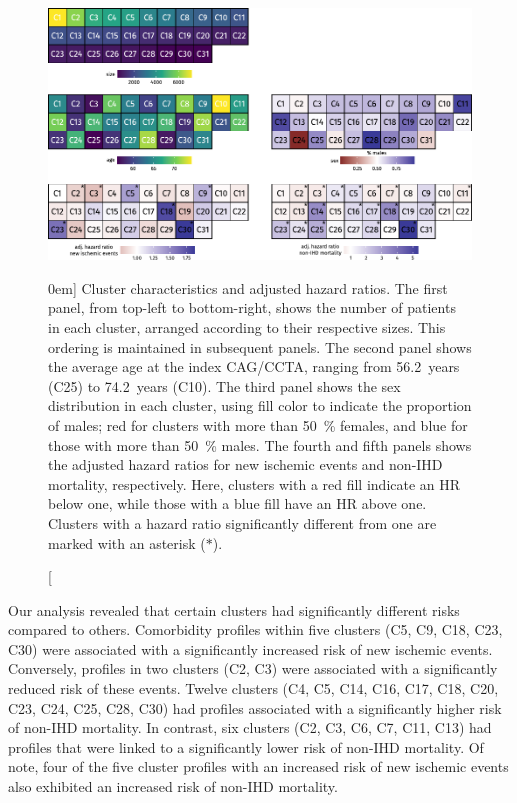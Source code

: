 \begin{figure}[t!]%
    \includegraphics{graphics/clustering-results.pdf}
    \caption[Cluster Characteristics and Outcomes][0em]{%
        Cluster characteristics and adjusted hazard ratios.
        The first panel,
        from top-left to bottom-right,
        shows the number
        of patients in each cluster, 
        arranged according to their respective sizes.
        This ordering is maintained in subsequent panels.
        The second panel shows the average age at the index \ac{CAG}/\ac{CCTA},
        ranging from \qty{56.2}{years} (C25) to \qty{74.2}{years} (C10).
        The third panel shows the sex distribution in each cluster,
        using fill color to indicate the proportion of males;
        red for clusters with more than \qty{50}{\percent} females,
        and blue for those with more than \qty{50}{\percent} males.
        The fourth and fifth panels shows the adjusted hazard ratios
        for new ischemic events and non-\ac{IHD} mortality, respectively.
        Here, clusters with a red fill indicate an \ac{HR} below one,
        while those with a blue fill have an \ac{HR} above one.
        Clusters with a hazard ratio significantly different from
        one are marked with an asterisk (\(*\)).
    }
    \label{fig:cluster-results}
\end{figure}%

Our analysis revealed that
certain clusters had significantly different risks compared to others.
Comorbidity profiles within five clusters (C5, C9, C18, C23, C30) were
associated with a significantly increased risk of new ischemic events.
Conversely, profiles in two clusters (C2, C3) were associated with a 
significantly reduced risk of these events. 
Twelve clusters (C4, C5, C14, C16, C17, C18, C20, C23, C24, C25,
C28, C30) had profiles associated with a significantly higher risk 
of non-\ac{IHD} mortality. 
In contrast, six clusters (C2, C3, C6, C7, C11, C13) had
profiles that were linked to a significantly lower risk of 
non-\ac{IHD} mortality.
Of note, four of the five cluster profiles with an increased risk of 
new ischemic events also exhibited an increased risk of 
non-\ac{IHD} mortality. 

